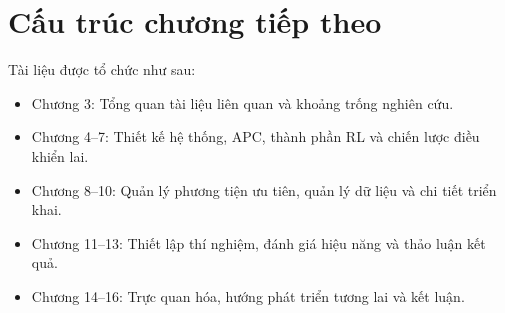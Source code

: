 \section{Cấu trúc chương tiếp theo}
Tài liệu được tổ chức như sau:
\begin{itemize}
    \item Chương 3: Tổng quan tài liệu liên quan và khoảng trống nghiên cứu.
    \item Chương 4–7: Thiết kế hệ thống, APC, thành phần RL và chiến lược điều khiển lai.
    \item Chương 8–10: Quản lý phương tiện ưu tiên, quản lý dữ liệu và chi tiết triển khai.
    \item Chương 11–13: Thiết lập thí nghiệm, đánh giá hiệu năng và thảo luận kết quả.
    \item Chương 14–16: Trực quan hóa, hướng phát triển tương lai và kết luận.
\end{itemize}
